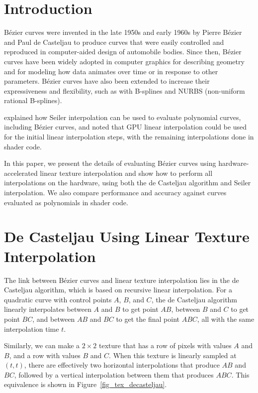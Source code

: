 \documentclass{jcgt}
\begin{document}
\section{Introduction}
\label{sec:introduction}

Bézier curves were invented in the late 1950s and early 1960s by Pierre Bézier and Paul de Casteljau to produce curves that were easily controlled and reproduced in computer-aided design
of automobile bodies. Since then, Bézier curves have been widely adopted in computer graphics for describing geometry and for modeling how data animates over time or in response to other
parameters. Bézier curves have also been extended to increase their expressiveness and flexibility, such as with B-splines and NURBS (non-uniform rational B-splines). 

\citet{10.1145/3641233.3664331} explained how Seiler interpolation can be used to evaluate polynomial curves, including Bézier curves, and noted that GPU linear
interpolation could be used for the initial linear interpolation steps, with the remaining interpolations done in shader code.

In this paper, we present the details of evaluating Bézier curves using hardware-accelerated linear texture interpolation and show how to perform all interpolations on the hardware,
using both the de Casteljau algorithm and Seiler interpolation. We also compare performance and accuracy against curves evaluated as polynomials in shader code.

\section{De Casteljau Using Linear Texture Interpolation}


The link between Bézier curves and linear texture interpolation lies in the de Casteljau algorithm, which is based on recursive linear interpolation. For a quadratic curve with control points
$A$, $B$, and $C$, the de Casteljau algorithm linearly interpolates between $A$ and $B$ to get point $AB$, between $B$ and $C$ to get point $BC$, and between $AB$ and $BC$ to get the final
point $ABC$, all with the same interpolation time $t$.

Similarly, we can make a $2 \times 2$ texture that has a row of pixels with values $A$ and $B$, and a row with values $B$ and $C$. When this texture is linearly sampled at $(t, t)$, there
are effectively two horizontal interpolations that produce $AB$ and $BC$, followed by a vertical interpolation between them that produces $ABC$. This equivalence is shown in Figure~\ref{fig_tex_decasteljau}.
\end{document}
